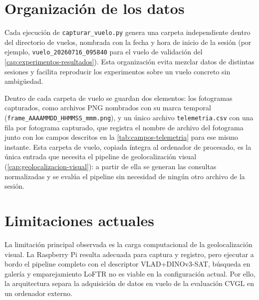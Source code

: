 \section{Organización de los datos}
\label{sec:organizacion-datos}

Cada ejecución de \texttt{capturar\_vuelo.py} genera una carpeta independiente dentro del directorio de vuelos, nombrada con la fecha y hora de inicio de la sesión (por ejemplo, \texttt{vuelo\_20260716\_095840} para el vuelo de validación del \autoref{cap:experimentos-resultados}). Esta organización evita mezclar datos de distintas sesiones y facilita reproducir los experimentos sobre un vuelo concreto sin ambigüedad.

Dentro de cada carpeta de vuelo se guardan dos elementos: los fotogramas capturados, como archivos PNG nombrados con su marca temporal (\texttt{frame\_AAAAMMDD\_HHMMSS\_mmm.png}), y un único archivo \texttt{telemetria.csv} con una fila por fotograma capturado, que registra el nombre de archivo del fotograma junto con los campos descritos en la \autoref{tab:campos-telemetria} para ese mismo instante. Esta carpeta de vuelo, copiada íntegra al ordenador de procesado, es la única entrada que necesita el pipeline de geolocalización visual (\autoref{cap:geolocalizacion-visual}): a partir de ella se generan las consultas normalizadas y se evalúa el pipeline sin necesidad de ningún otro archivo de la sesión.

\section{Limitaciones actuales}
\label{sec:limitaciones-software}

La limitación principal observada es la carga computacional de la geolocalización visual. La Raspberry Pi resulta adecuada para captura y registro, pero ejecutar a bordo el pipeline completo con el descriptor VLAD+DINOv3-SAT, búsqueda en galería y emparejamiento LoFTR no es viable en la configuración actual. Por ello, la arquitectura separa la adquisición de datos en vuelo de la evaluación CVGL en un ordenador externo.

